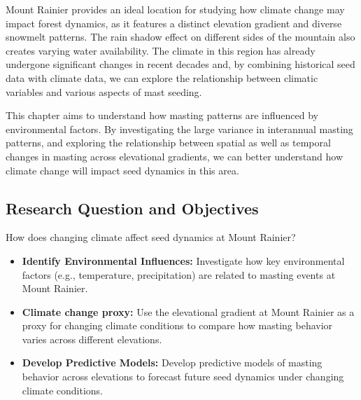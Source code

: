 \documentclass[11pt,letter]{article}
\begin{document}
Mount Rainier provides an ideal location for studying how climate change may impact forest dynamics, as it features a distinct elevation gradient and diverse snowmelt patterns. The rain shadow effect on different sides of the mountain also creates varying water availability. The climate in this region has already undergone significant changes in recent decades and, by combining historical seed data with climate data, we can explore the relationship between climatic variables and various aspects of mast seeding.\par

This chapter aims to understand how masting patterns are influenced by environmental factors. By investigating the large variance in interannual masting patterns, and exploring the relationship between spatial as well as temporal changes in masting across elevational gradients, we can better understand how climate change will impact seed dynamics in this area.\par

\subsection{Research Question and Objectives}
How does changing climate affect seed dynamics at Mount Rainier?
\begin{itemize}
\item\textbf{Identify Environmental Influences:} Investigate how key environmental factors (e.g., temperature, precipitation) are related to masting events at Mount Rainier.
\item\textbf{Climate change proxy:} Use the elevational gradient at Mount Rainier as a proxy for changing climate conditions to compare how masting behavior varies across different elevations.
\item\textbf{Develop Predictive Models:} Develop predictive models of masting behavior across elevations to forecast future seed dynamics under changing climate conditions.
\end{itemize}
\end{document}
